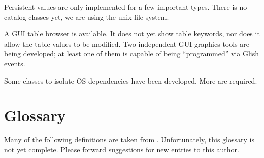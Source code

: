 Persistent values are only implemented for a few important types. There
is no catalog classes yet, we are using the unix file system.

A GUI table browser is available. It does not yet show table keywords,
nor does it allow the table values to be modified. Two independent GUI
graphics tools are being developed; at least one of them is capable of
being ``programmed'' via Glish events.

Some classes to isolate OS dependencies have been developed. More are
required.





\section{Glossary}

Many of the following definitions are taken from
\cite{holdaway:glossary,aips:glossary}. Unfortunately, this glossary
is not yet complete. Please forward suggestions for new entries to
this author.

\def\bold#1{{\bf#1}}
\def\qv{({\it q.v.})}
\def\text#1{\hbox{\it#1}}


